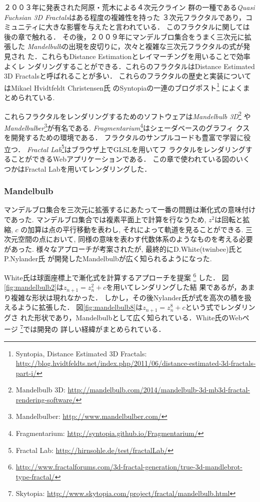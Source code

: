 ２００３年に発表された阿原・荒木\cite{sphairahedra}による４次元クライン
群の一種である{\it Quasi Fuchsian 3D Fractals}はある程度の複雑性を持った
３次元フラクタルであり，コミュニティに大きな影響を与えたと言われている．
このフラクタルに関しては後の章で触れる．
その後，２００９年にマンデルブロ集合をうまく三次元に拡張した{\it
Mandelbulb}の出現を皮切りに，次々と複雑な三次元フラクタルの式が発見され
た．これらもDistance Estimationとレイマーチングを用いることで効率よくレ
ンダリングすることができる．これらのフラクタルはDistance Estimated 3D
Fractalsと呼ばれることが多い．
これらのフラクタルの歴史と実装についてはMikael Hvidtfeldt Christensen氏
のSyntopiaの一連のブログポスト\footnote{Syntopia, Distance Estimated 3D
Fractals:\\ \quad \quad
\url{http://blog.hvidtfeldts.net/index.php/2011/06/distance-estimated-3d-fractals-part-i/}}
によくまとめられている.

これらフラクタルをレンダリングするためのソフトウェアは{\it Mandelbulb
3D}\footnote{Mandelbulb 3D:
\url{http://mandelbulb.com/2014/mandelbulb-3d-mb3d-fractal-rendering-software/}}
や{\it Mandelbulber}\footnote{Mandelbulber:
\url{http://www.mandelbulber.com/}}が有名である.
{\it Fragmentarium}\footnote{Fragmentarium:
\url{http://syntopia.github.io/Fragmentarium/}}はシェーダベースのグラフィ
クスを開発するための環境である．
フラクタルのサンプルコードも豊富で学習に役立つ．
{\it Fractal Lab}\footnote{Fractal Lab:
\url{http://hirnsohle.de/test/fractalLab/}}はブラウザ上でGLSLを用いてフ
ラクタルをレンダリングすることができるWebアプリケーションである．
この章で使われている図のいくつかはFractal Labを用いてレンダリングした．

\subsubsection{Mandelbulb}

マンデルブロ集合を三次元に拡張するにあたって一番の問題は漸化式の意味付けであった.
マンデルブロ集合では複素平面上で計算を行なうため, $z^2$は回転と拡縮, $c$
の加算は点の平行移動を表わし, それによって軌道を見ることができる.
三次元空間の点において, 同様の意味を表わす代数体系のようなものを考える必要があった.
様々なアプローチが考案されたが, 最終的にD.White(twinbee)氏とP.Nylander氏
が開発したMandelbulbが広く知られるようになった.

White氏は球面座標上で漸化式を計算するアプローチを提案
\footnote{\url{http://www.fractalforums.com/3d-fractal-generation/true-3d-mandlebrot-type-fractal/}}
した．
図\ref{fig:mandelbulb2}は$z_{n+1} = z_n^2 + c$を用いてレンダリングした結
果であるが，あまり複雑な形状は現れなかった．
しかし，その後Nylander氏が式を高次の積を扱えるように拡張した．
図\ref{fig:mandelbulb8}は$z_{n+1} = z_n^8 + c $という式でレンダリングさ
れた形状であり，Mandelbulbとして広く知られている．White氏のWebページ
\footnote{Skytopia:
\url{http://www.skytopia.com/project/fractal/mandelbulb.html}}では開発の
詳しい経緯がまとめられている．

